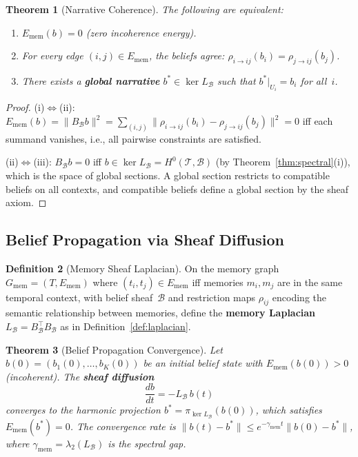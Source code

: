 \documentclass[11pt,a4paper]{article}
\theoremstyle{plain}
\newtheorem{theorem}{Theorem}[section]
\theoremstyle{definition}
\newtheorem{definition}[theorem]{Definition}
\theoremstyle{remark}
\newcommand{\cT}{\mathcal{T}}
\newcommand{\cB}{\mathcal{B}}
\begin{document}
\begin{theorem}[Narrative Coherence]\label{thm:narrative}
The following are equivalent:
\begin{enumerate}[label=(\roman*),nosep]
\item $E_{\mathrm{mem}}(b) = 0$ (zero incoherence energy).
\item For every edge $(i,j) \in E_{\mathrm{mem}}$, the beliefs agree: $\rho_{i \to ij}(b_i) = \rho_{j \to ij}(b_j)$.
\item There exists a \textbf{global narrative} $b^* \in \ker L_\cB$ such that $b^*|_{U_i} = b_i$ for all~$i$.
\end{enumerate}
\end{theorem}

\begin{proof}
(i)$\Leftrightarrow$(ii): $E_{\mathrm{mem}}(b) = \|B_\cB b\|^2 = \sum_{(i,j)} \|\rho_{i \to ij}(b_i) - \rho_{j \to ij}(b_j)\|^2 = 0$ iff each summand vanishes, i.e., all pairwise constraints are satisfied.

(ii)$\Leftrightarrow$(iii): $B_\cB b = 0$ iff $b \in \ker L_\cB = H^0(\cT, \cB)$ (by Theorem~\ref{thm:spectral}(i)), which is the space of global sections. A global section restricts to compatible beliefs on all contexts, and compatible beliefs define a global section by the sheaf axiom.
\end{proof}

\subsection{Belief Propagation via Sheaf Diffusion}

\begin{definition}[Memory Sheaf Laplacian]\label{def:mem-laplacian}
On the memory graph $G_{\mathrm{mem}} = (T, E_{\mathrm{mem}})$ where $(t_i, t_j) \in E_{\mathrm{mem}}$ iff memories $m_i, m_j$ are in the same temporal context, with belief sheaf~$\cB$ and restriction maps $\rho_{ij}$ encoding the semantic relationship between memories, define the \textbf{memory Laplacian} $L_\cB = B_\cB^\top B_\cB$ as in Definition~\ref{def:laplacian}.
\end{definition}

\begin{theorem}[Belief Propagation Convergence]\label{thm:belief-propagation}
Let $b(0) = (b_1(0), \ldots, b_K(0))$ be an initial belief state with $E_{\mathrm{mem}}(b(0)) > 0$ (incoherent). The \textbf{sheaf diffusion}
\begin{equation}\label{eq:belief-diffusion}
\frac{db}{dt} = -L_\cB \, b(t)
\end{equation}
converges to the harmonic projection $b^* = \pi_{\ker L_\cB}(b(0))$, which satisfies $E_{\mathrm{mem}}(b^*) = 0$. The convergence rate is $\|b(t) - b^*\| \leq e^{-\gamma_{\mathrm{mem}} t}\|b(0) - b^*\|$, where $\gamma_{\mathrm{mem}} = \lambda_2(L_\cB)$ is the spectral gap.
\end{theorem}
\end{document}
